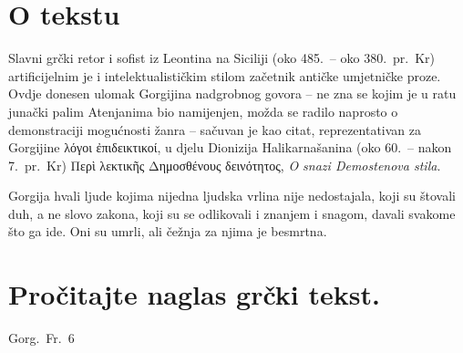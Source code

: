 


\section*{O tekstu}

Slavni grčki retor i sofist iz Leontina na Siciliji (oko 485.\ – oko 380.\ pr.~Kr) artificijelnim je i intelektualističkim stilom začetnik antičke umjetničke proze. Ovdje donesen ulomak Gorgijina nadgrobnog govora – ne zna se kojim je u ratu junački palim Atenjanima bio namijenjen, možda se radilo naprosto o demonstraciji mogućnosti žanra – sačuvan je kao citat, reprezentativan za Gorgijine λόγοι ἐπιδεικτικοί, u djelu Dionizija Halikarnašanina (oko 60.\ – nakon 7.\ pr.~Kr) Περὶ λεκτικῆς Δημοσθένους δεινότητος, \textit{O snazi Demostenova stila}.

Gorgija hvali ljude kojima nijedna ljudska vrlina nije nedostajala, koji su štovali duh, a ne slovo zakona, koji su se odlikovali i znanjem i snagom, davali svakome što ga ide. Oni su umrli, ali čežnja za njima je besmrtna.



\section*{Pročitajte naglas grčki tekst.}

Gorg.\ Fr.\ 6


\medskip


